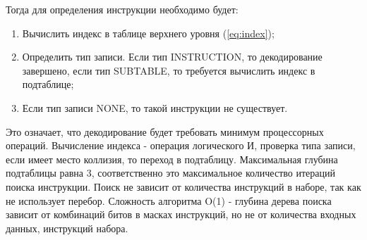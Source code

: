 Тогда для определения инструкции необходимо будет:

\begin{enumerate}
	\item Вычислить индекс в таблице верхнего уровня (\ref{eq:index});
	\item Определить тип записи. Если тип INSTRUCTION, то декодирование завершено, если тип SUBTABLE, то требуется вычислить индекс в подтаблице;
	\item Если тип записи NONE, то такой инструкции не существует. 
\end{enumerate}

Это означает, что декодирование будет требовать минимум процессорных операций. Вычисление индекса - операция логического И, проверка типа записи, если имеет место коллизия, то переход в подтаблицу. Максимальная глубина подтаблицы равна 3, соответственно это максимальное количество итераций поиска инструкции. Поиск не зависит от количества инструкций в наборе, так как не использует перебор. Сложность алгоритма O(1) - глубина дерева поиска зависит от комбинаций битов в масках инструкций, но не от количества входных данных, инструкций набора.



